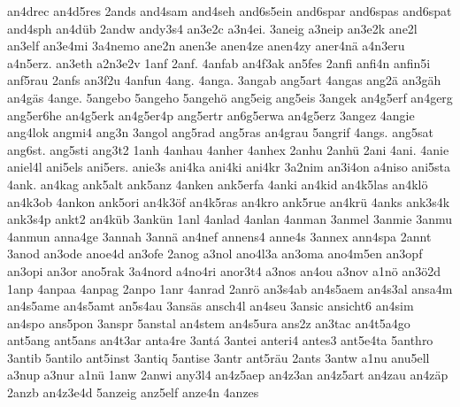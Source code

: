 {    an4drec
    an4d5res
    2ands
    and4sam
    and4seh
    and6s5ein
    and6spar
    and6spas
    and6spat
    and4sph
    an4düb
    2andw
    andy3s4
    an3e2c
    a3n4ei.
    3aneig
    a3neip
    an3e2k
    ane2l
    an3elf
    an3e4mi
    3a4nemo
    ane2n
    anen3e
    anen4ze
    anen4zy
    aner4nä
    a4n3eru
    a4n5erz.
    an3eth
    a2n3e2v
    1anf
    2anf.
    4anfab
    an4f3ak
    an5fes
    2anfi
    anfi4n
    anfin5i
    anf5rau
    2anfs
    an3f2u
    4anfun
    4ang.
    4anga.
    3angab
    ang5art
    4angas
    ang2ä
    an3gäh
    an4gäs
    4ange.
    5angebo
    5angeho
    5angehö
    ang5eig
    ang5eis
    3angek
    an4g5erf
    an4gerg
    ang5er6he
    an4g5erk
    an4g5er4p
    ang5ertr
    an6g5erwa
    an4g5erz
    3angez
    4angie
    ang4lok
    angmi4
    ang3n
    3angol
    ang5rad
    ang5ras
    an4grau
    5angrif
    4angs.
    ang5sat
    ang6st.
    ang5sti
    ang3t2
    1anh
    4anhau
    4anher
    4anhex
    2anhu
    2anhü
    2ani
    4ani.
    4anie
    aniel4l
    ani5els
    ani5ers.
    anie3s
    ani4ka
    ani4ki
    ani4kr
    3a2nim
    an3i4on
    a4niso
    ani5sta
    4ank.
    an4kag
    ank5alt
    ank5anz
    4anken
    ank5erfa
    4anki
    an4kid
    an4k5las
    an4klö
    an4k3ob
    4ankon
    ank5ori
    an4k3öf
    an4k5ras
    an4kro
    ank5rue
    an4krü
    4anks
    ank3s4k
    ank3s4p
    ankt2
    an4küb
    3ankün
    1anl
    4anlad
    4anlan
    4anman
    3anmel
    3anmie
    3anmu
    4anmun
    anna4ge
    3annah
    3annä
    an4nef
    annens4
    anne4s
    3annex
    ann4spa
    2annt
    3anod
    an3ode
    anoe4d
    an3ofe
    2anog
    a3nol
    ano4l3a
    an3oma
    ano4m5en
    an3opf
    an3opi
    an3or
    ano5rak
    3a4nord
    a4no4ri
    anor3t4
    a3nos
    an4ou
    a3nov
    a1nö
    an3ö2d
    1anp
    4anpaa
    4anpag
    2anpo
    1anr
    4anrad
    2anrö
    an3s4ab
    an4s5aem
    an4s3al
    ansa4m
    an4s5ame
    an4s5amt
    an5s4au
    3ansäs
    ansch4l
    an4seu
    3ansic
    ansicht6
    an4sim
    an4spo
    ans5pon
    3anspr
    5anstal
    an4stem
    an4s5ura
    ans2z
    an3tac
    an4t5a4go
    ant5ang
    ant5ans
    an4t3ar
    anta4re
    3antá
    3antei
    anteri4
    antes3
    ant5e4ta
    5anthro
    3antib
    5antilo
    ant5inst
    3antiq
    5antise
    3antr
    ant5räu
    2ants
    3antw
    a1nu
    anu5ell
    a3nup
    a3nur
    a1nü
    1anw
    2anwi
    any3l4
    an4z5aep
    an4z3an
    an4z5art
    an4zau
    an4zäp
    2anzb
    an4z3e4d
    5anzeig
    anz5elf
    anze4n
    4anzes
}
